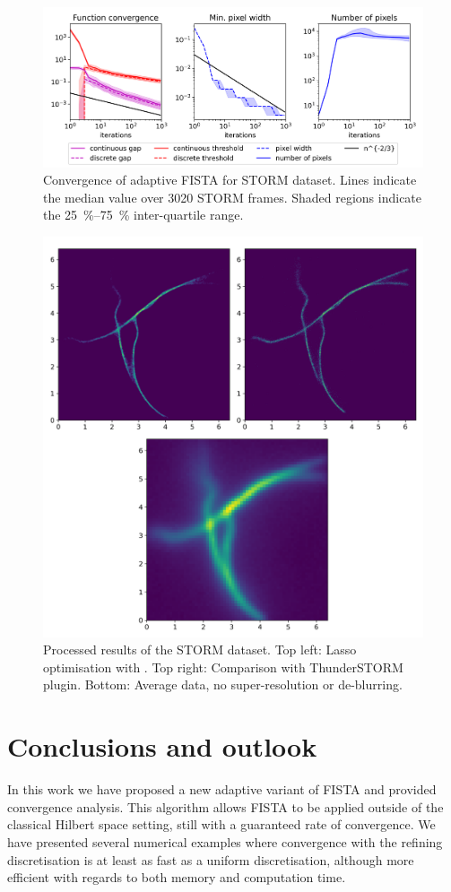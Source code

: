 \documentclass[10pt,a4paper,onecolumn]{article}
\numberwithin{equation}{section}
\begin{document}
\begin{figure}[H]\centering
	\includegraphics[width=\textwidth]{lasso2_convergence}
	\caption{Convergence of adaptive FISTA for STORM dataset. Lines indicate the median value over 3020 STORM frames. Shaded regions indicate the \SIrange{25}{75}{\percent} inter-quartile range.}\label{fig: STORM convergence}
\end{figure}
\begin{figure}\centering
	\includegraphics[width=.77\textwidth]{STORM_recon}
	\caption{Processed results of the STORM dataset. Top left: Lasso optimisation with . Top right: Comparison with ThunderSTORM plugin. Bottom: Average data, no super-resolution or de-blurring.}\label{fig: STORM results}
\end{figure}

\section{Conclusions and outlook}
In this work we have proposed a new adaptive variant of FISTA and provided convergence analysis. This algorithm allows FISTA to be applied outside of the classical Hilbert space setting, still with a guaranteed rate of convergence. We have presented several numerical examples where convergence with the refining discretisation is at least as fast as a uniform discretisation, although more efficient with regards to both memory and computation time. 
\end{document}
